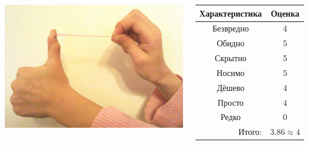 \begin{frame} %
    \begin{columns}
            \begin{center}
                \includegraphics[width=\textwidth]{fig/elastic}
            \end{center}
            
            \begin{center}
                \begin{tabular}{c|c}
                    \hline\hline
                    Характеристика              & Оценка\\ \hline\hline
                    Безвредно                   & 4 \\
                    Обидно                      & 5 \\
                    Скрытно                     & 5 \\
                    Носимо                      & 5 \\
                    Дёшево                      & 4 \\
                    Просто                      & 4 \\ 
                    Редко                       & 0 \\ \hline
                    \multicolumn{1}{r|}{Итого:} & $3.86\approx 4$ \\
                \end{tabular}
            \end{center}
    \end{columns}    
\end{frame}

